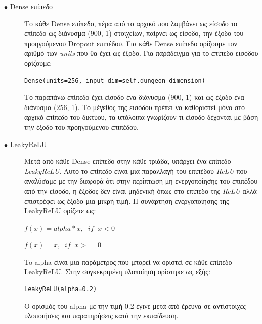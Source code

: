 \begin{description}
\item[$\bullet$ Dense επίπεδο] Το κάθε Dense επίπεδο, πέρα από το αρχικό που λαμβάνει ως είσοδο το επίπεδο ως διάνυσμα (900, 1) στοιχείων, παίρνει ως είσοδο, την έξοδο του προηγούμενου Dropout επιπέδου. Για κάθε Dense επίπεδο ορίζουμε τον αριθμό των \textit{units} που θα έχει ως έξοδο. Για παράδειγμα για το επίπεδο εισόδου ορίζουμε:
\begin{verbatim}
Dense(units=256, input_dim=self.dungeon_dimension)
\end{verbatim}
\par
Το παραπάνω επίπεδο έχει είσοδο ένα διάνυσμα (900, 1) και ως έξοδο ένα διάνυσμα (256, 1). Το μέγεθος της εισόδου πρέπει να καθοριστεί μόνο στο αρχικό επίπεδο του δικτύου, τα υπόλοιπα γνωρίζουν τι είσοδο δέχονται με βάση την έξοδο του προηγούμενου επιπέδου.  \cite{dense}
\end{description}

\begin{description}
\item[$\bullet$ LeakyReLU] Μετά από κάθε Dense επίπεδο στην κάθε τριάδα, υπάρχει ένα επίπεδο \textit{LeakyReLU}. Αυτό το επίπεδο είναι μια παραλλαγή του επιπέδου \textit{ReLU} που αναλύσαμε με την διαφορά ότι στην περίπτωση μη ενεργοποίησης του επιπέδου από την είσοδο, η έξοδος δεν είναι μηδενική όπως στο επίπεδο της \textit{ReLU} αλλά επιστρέφει ως έξοδο μια μικρή τιμή. Η συνάρτηση ενεργοποίησης της LeakyReLU ορίζετε ως:
\par
$f(x) = alpha * x,  \;\; if \;\; x < 0$
\par
$f(x) = x,  \;\; if \;\; x >= 0$
\par
To alpha είναι μια παράμετρος που μπορεί να οριστεί σε κάθε επίπεδο LeakyReLU. Στην συγκεκριμένη υλοποίηση ορίστηκε ως εξής:
\begin{verbatim}
LeakyReLU(alpha=0.2)
\end{verbatim}
\par
O ορισμός του alpha με την τιμή 0.2 έγινε μετά από έρευνα σε αντίστοιχες υλοποιήσεις και παρατηρήσεις κατά την εκπαίδευση. \cite{firstgan} \cite{firstgan2} \cite{firstgan3} 
\end{description}

